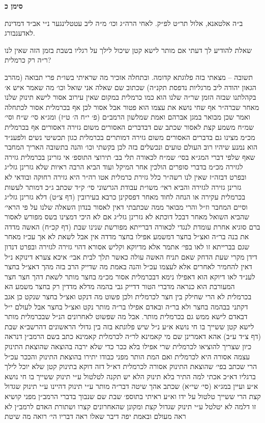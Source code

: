\documentclass[12pt, openany]{book}
\newcommand{\chapname}{}
\newcommand{\newchap}[1]{
	\addcontentsline{toc}{chapter}{#1}
	\renewcommand{\chapname}{#1}
		\begin{center}
			\textbf{%
\fontsize{16pt}{16pt}\selectfont
				#1}
		\end{center}
}
\begin{document}
\newchap{סימן כ}
\begin{multicols}{2}
ב״ה אלטאנא, אלול תר״ט לפ״ק. לאחי הרה״ג וכו׳ מ״ה ליב עטטלינגער נ״י אב״ד דמדינת לאדענבורג.\\\vspace{0pt}

שאלת להודיע לך דעתי אם מותר לישא קטן שיכול לילך על רגליו בשבת בזמן הזה שאין לנו ר״ה רק כרמלית?\\\vspace{0pt}

תשובה – מצאתי בזה פלוגתא קדומה. ובתחלה אזכיר מה שראיתי בשו״ת פרי תבואה (מהרב הגאון יהודה ליב מרגליות נדפסת תקנ״ה) שכתוב שם שאלה אני שואל וכו׳ מה שאמר איש א׳ בקהלתנו שבזה הזמן שר״ה שלנו הוא כמו כרמלית במקום שאין עירוב אסור לישא תינוק שלנו מאחר שברה״ר אף שחי נושא את עצמו הוא פטור אבל אסור לכן אף בכרמלית אסור לכתחלה ואמר שכן מבואר במגן אברהם ואמת שמלשון הרמב״ם (פ׳ י״ח ה׳ ט״ז) ומג״א סי׳ ש״ח וסי׳ שמ״ח משמע קצת לאסור שכתב שם דבדברים האסורים משום גזירה דאסורים אף בכרמלית מכ״מ מצינו גם בדברים האסורים משום גזירה דמותרים בכרמלית כגון תכשיטי נשים ולפענ״ד הוא נמנע שיהיו רוב העולם טועים ונכשלים בזה לכן בקשתי וכו׳ והנה בתשובה האריך המחבר שאף שלפי דברי המג״א בסי׳ שמ״ח לכאורה תלי בב׳ תירוצי התוספ׳ אי גזרינן בכרמלית גזירה לגזירה מכ״מ בדברי סופרים הולכין אחר המיקל ועוד הביא הרבה ראיות שלא גזרינן גזל״ג ובפרט דבזה״ז שאין לנו רשה״ר כלל גזירת כרמלית אטו רה״ר היא גזירה רחוקה ובודאי לא גזרינן גזירה לגזירה והביא ראי׳ משו״ת עבודת הגרשוני סי׳ ק״ד שכתב ג״כ דמותר לעשות בכרמלית עקירה או הנחה לחוד מאחר דפסקינן כרבא בעירובין (דף צ״ט) דלא גזרינן גזל״ג וסיים המחבר וז״ל והרי מבואר ממה שכתבתי דאין לאסור בנדון השאלה שלנו על פי הראי׳ שהביא השואל מאחר דבכל דוכתא לא גזרינן גזל״ג אם לא היכי דמצינו בשס מפורש לאסור ברם סוגיא אחרת עומדת לנגדי לכאורה דברייתא מפורשת שנינו שבת (דף קכ״ח) האשה מדדה את בנה בר״ה ואצ״ל בחצר דמשמע אפילו בחצר מדדה אין אבל לשאת לא אך עכ״ז מאחר שגם בברייתא זו לאו בפי׳ אתמר אלא מדיוקא וקליש אסורא דהוי גזירה לגזירה ובפרט דנדון דידן מקרי שעת הדחק שאם תניח האשה עולה כאשר תלך לבית אבי׳ איכא צערא דינוקא נ״ל דאין להחמיר לאחרים אלא לעצמו עכ״ל והנה באמת מה שדייק הרב בזה מהך דאצ״ל בחצר לענ״ד לאו דיוקא הוא דאפילו נימא דבכרמלית אסור מכ״מ בחצר מותר לשאת דהך חצר חצר המעורבת הוא כנראה מדברי הטור דדייק גבי בהמה מדלא מדדין רק בחצר משמע הא בכרמלית לא הרי שחילק בין חצר לכרמלית ולכן פשוט מה דנקט ואצ״ל בחצר שנקט כן אגב דקתני בבהמה בחצר ולא בר״ה ובאדם אפילו בר״ה מותר נקט ואצ״ל בחצר אבל לעולם י״ל דבאדם לישא ממש גם בכרמלית מותר. אבל מה שפשוט לאחרונים הנ״ל שבכרמלית מותר לישא קטן ששייך בו חי נושא א״ע נ״ל שיש פלוגתא בזה בין גדולי הראשונים דהרשב״א שבת (דף צ״ד ע״ב) אהא דאמרינן שם מי קאמינא לר״ה לכרמלית קאמינא כתב בשם הרמב״ן דנראה כיון שצריך להוציאו לכרמלית שרי אפילו בלא ככר כדי שלא ירבה בהוצאה שהוצאת התינוק עצמה אסורה היא לכרמלית ואם המת הותר מפני כבודו יתירו בהוצאת התינוק והככר עכ״ל הרי שכתב בפי׳ שהוצאת התינוק אסורה לכרמלית דא״ל דזה דוקא בתינוק קטן שלא יוכל לילך ברגליו דא״כ אכתי למה התיר בלא תינוק הלא יש תקנה לטלטול ע״י תינוק ששייך בו חי נושא א״ע ועיין במג״א (סי׳ שי״א) שכתב אהך שיטה דבר״ה מותר ע״י תינוק דהיינו ע״י תינוק שגדול קצת הרי ששייך טלטול על ידו וא״ע ראיתי בתוספ׳ שבת שם שנבוך בדברי הרמב״ן מפני קושיא זו דלמה לא יטלטל ע״י תינוק שגדול קצת ומקונן שהאחרונים קצרו ושתורת האדם לרמב״ן לא ראה מעולם ובאמת יפה דיבר שאלו ראה דבריו הי׳ רואה מה שיטת 
\end{multicols}
\end{document}
